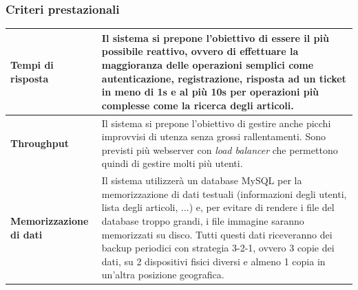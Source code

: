\documentclass[12pt,a4paper]{article}
\begin{document}
\subsubsection{Criteri prestazionali}
\begin{tabular}{|p{4cm}|p{12cm}|}
\hline
\textbf{Tempi di risposta} & Il sistema si prepone l'obiettivo di essere il più possibile reattivo, ovvero di effettuare la maggioranza delle operazioni semplici come autenticazione, registrazione, risposta ad un ticket in meno di 1s e al più 10s per operazioni più complesse come la ricerca degli articoli. \\
\hline
\textbf{Throughput} & Il sistema si prepone l'obiettivo di gestire anche picchi improvvisi di utenza senza grossi rallentamenti. Sono previsti più webserver con \emph{load balancer} che permettono quindi di gestire molti più utenti. \\
\hline
\textbf{Memorizzazione di dati} & Il sistema utilizzerà un database MySQL per la memorizzazione di dati testuali (informazioni degli utenti, lista degli articoli, ...) e, per evitare di rendere i file del database troppo grandi, i file immagine saranno memorizzati su disco. Tutti questi dati riceveranno dei backup periodici con strategia 3-2-1, ovvero 3 copie dei dati, su 2 dispositivi fisici diversi e almeno 1 copia in un'altra posizione geografica. \\
\hline
\end{tabular}
\end{document}
